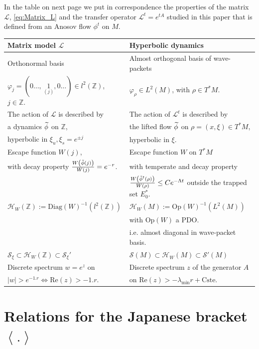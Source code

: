 \documentclass[10pt]{amsart}
\theoremstyle{definition}\newtheorem{defi}[theo]{Definition}\newtheorem{rema}[theo]{Remark}\newtheorem{exam}[theo]{Example}\newtheorem{exem}[theo]{Example}\newtheorem{nota}[theo]{Notation}
\newcommand{\clS}{\mathcal{S}}
\newcommand{\clH}{\mathcal{H}}
\newcommand{\clL}{\mathcal{L}}
\newcommand{\Ree}{\mathrm{Re}}
\newcommand{\Cste}{\mathrm{Cste}}
\newcommand{\Diag}{\mathrm{Diag}}
\newcommand{\Opp}{\mathrm{Op}}
\newcommand{\bbZ}{\mathbb{Z}}
\let\oldtilde\tilde
\renewcommand*{\tilde}[1]{\mathchoice{\widetilde{#1}}{\widetilde{#1}}{\oldtilde{#1}}{\oldtilde{#1}}}
\begin{document}
In the table on next page we put in correspondence the properties of the matrix $\clL$, \eqref{eq:Matrix_L} and the transfer operator $\clL^{t}=e^{tA}$ studied in this paper that is defined from an Anosov flow $\phi^{t}$ on $M$.
\begin{table}
\centering
\begin{tabular}{|l|l|}
\hline Matrix model $\clL$ & Hyperbolic dynamics\tabularnewline
\hline
\hline Orthonormal basis & Almost orthogonal basis of wave-packets\tabularnewline $\varphi_{j}=\left(0\ldots,\,\underset{(j)}{1},0\ldots\right)\in l^{2}\left(\bbZ\right)$, $j\in\bbZ$. & {$\varphi_{\rho}\in L^{2}\left(M\right)$, }with $\rho\in T^{*}M$.\tabularnewline
\hline The action of $\clL$ is described by & The action of $\clL^{t}$ is described by\tabularnewline a dynamics $\tilde{\phi}$ on $\bbZ$, & the lifted flow $\tilde{\phi}$ on $\rho=\left(x,\xi\right)\in T^{*}M$,\tabularnewline hyperbolic in $\xi_{u},\xi_{s}=e^{\pm j}$ & hyperbolic in $\xi$.\tabularnewline
\hline Escape function $W\left(j\right)$, & Escape function $W$ on $T^{*}M$\tabularnewline with decay property $\frac{W\left(\tilde{\phi}\left(j\right)\right)}{W\left(j\right)}=e^{-r}$. & with temperate and decay property\tabularnewline & $\frac{W\left(\tilde{\phi}^{t}\left(\rho\right)\right)}{W\left(\rho\right)}\leq Ce^{-\Lambda t}$ outside the trapped set $E_{0}^{*}$.\tabularnewline
\hline $\clH _{W}\left(\bbZ\right):=\Diag\left(W\right)^{-1}\left(l^{2}\left(\bbZ\right)\right)$ & $\clH _{W}\left(M\right):=\Opp \left(W\right)^{-1}\left(L^{2}\left(M\right)\right)$\tabularnewline & with $\Opp \left(W\right)$ a PDO.\tabularnewline & i.e. almost diagonal in wave-packet basis.\tabularnewline
\hline $\clS_{\xi}\subset\clH _{W}\left(\bbZ\right)\subset\clS_{\xi}'$ & $\clS\left(M\right)\subset\clH _{W}\left(M\right)\subset\clS'\left(M\right)$\tabularnewline
\hline Discrete spectrum $w=e^{z}$ on & Discrete spectrum $z$ of the generator $A$\tabularnewline $\left|w\right|>e^{-1.r}\Leftrightarrow\Ree\left(z\right)>-1.r$. & on $\Ree\left(z\right)>-\lambda_{\min}r+\Cste$.\tabularnewline
\hline
\end{tabular}
\end{table}

\section{Relations for the Japanese bracket \texorpdfstring{$\left\langle.\right\rangle $}{<.> }}
\end{document}
